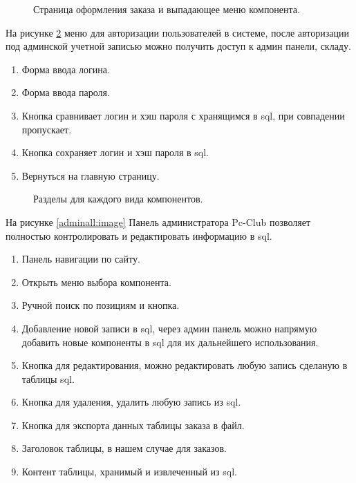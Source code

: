\begin{figure}[H]
\caption{Страница оформления заказа и выпадающее меню компонента.}
\label{main:image}
\end{figure}

На рисунке \ref{login:image} меню для авторизации пользователей в системе, после авторизации под админской учетной записью можно получить доступ к админ панели, складу.
\begin{enumerate}
	\item Форма ввода логина.
	\item Форма ввода пароля.
	\item Кнопка сравнивает логин и хэш пароля с хранящимся в sql, при совпадении пропускает.
	\item Кнопка сохраняет логин и хэш пароля в sql.
	\item Вернуться на главную страницу.
\end{enumerate}
\begin{figure}[ht]
	\caption{Разделы для каждого вида компонентов.}
	\label{login:image}
\end{figure}

На рисунке \ref{adminall:image} Панель администратора Pc-Club позволяет полностью контролировать и редактировать информацию в sql.

\begin{enumerate}
	\item Панель навигации по сайту.
	\item Открыть меню выбора компонента.
	\item Ручной поиск по позициям и кнопка.
	\item Добавление новой записи в sql, через админ панель можно напрямую добавить новые компоненты в sql для их дальнейшего использования.
	\item Кнопка для редактирования, можно редактировать любую запись сделаную в таблицы sql.
	\item Кнопка для удаления, удалить любую запись из sql.
	\item Кнопка для экспорта данных таблицы заказа в файл.
	\item Заголовок таблицы, в нашем случае для заказов.
	\item Контент таблицы, хранимый и извлеченный из sql.
\end{enumerate}

